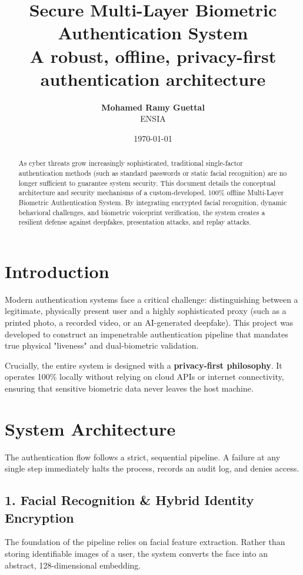 \documentclass[11pt, a4paper]{article}
\title{\textbf{\Huge Secure Multi-Layer Biometric Authentication System}\\\vspace{0.5em}\large A robust, offline, privacy-first authentication architecture}
\author{\textbf{Mohamed Ramy Guettal} \\ ENSIA}
\date{\today}
\begin{document}
\maketitle

\begin{abstract}
As cyber threats grow increasingly sophisticated, traditional single-factor authentication methods (such as standard passwords or static facial recognition) are no longer sufficient to guarantee system security. This document details the conceptual architecture and security mechanisms of a custom-developed, 100\% offline Multi-Layer Biometric Authentication System. By integrating encrypted facial recognition, dynamic behavioral challenges, and biometric voiceprint verification, the system creates a resilient defense against deepfakes, presentation attacks, and replay attacks.
\end{abstract}

\vspace{1em}

\section{Introduction}
Modern authentication systems face a critical challenge: distinguishing between a legitimate, physically present user and a highly sophisticated proxy (such as a printed photo, a recorded video, or an AI-generated deepfake). This project was developed to construct an impenetrable authentication pipeline that mandates true physical "liveness" and dual-biometric validation. 

Crucially, the entire system is designed with a \textbf{privacy-first philosophy}. It operates 100\% locally without relying on cloud APIs or internet connectivity, ensuring that sensitive biometric data never leaves the host machine.

\section{System Architecture}
The authentication flow follows a strict, sequential pipeline. A failure at any single step immediately halts the process, records an audit log, and denies access.

\subsection{1. Facial Recognition \& Hybrid Identity Encryption}
The foundation of the pipeline relies on facial feature extraction. Rather than storing identifiable images of a user, the system converts the face into an abstract, 128-dimensional embedding. 
\end{document}
